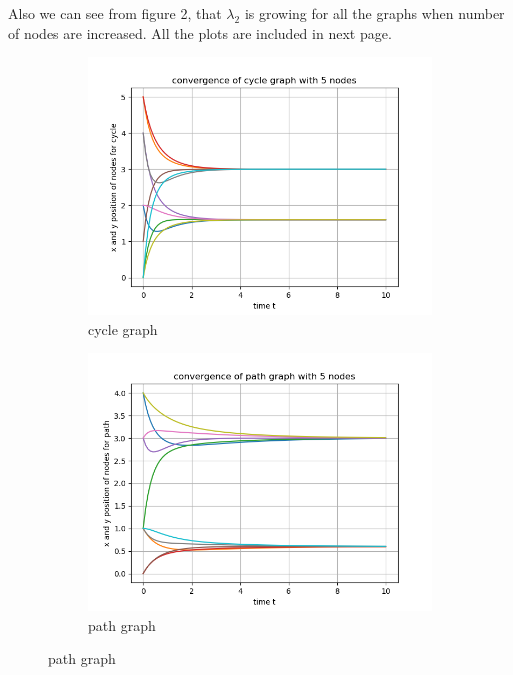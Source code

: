 \documentclass{article}
\begin{document}
\begin{problem}
    Also we can see from figure 2,  that $\lambda_2$ is growing for all the graphs when number of nodes are increased. All the plots are included in next page. 
    \begin{figure}[!ht]
        \centering
        \begin{subfigure}{0.4\textwidth}
            \includegraphics[width=\textwidth]{./img/p1convergence_cycle_graph_5.png}
            \caption{cycle graph}
        \end{subfigure}
        \begin{subfigure}{0.4\textwidth}
            \includegraphics[width=\textwidth]{./img/p1convergence_path_graph_5.png}
            \caption{path graph}
        \end{subfigure}

\end{figure}
\end{problem}
\end{document}
